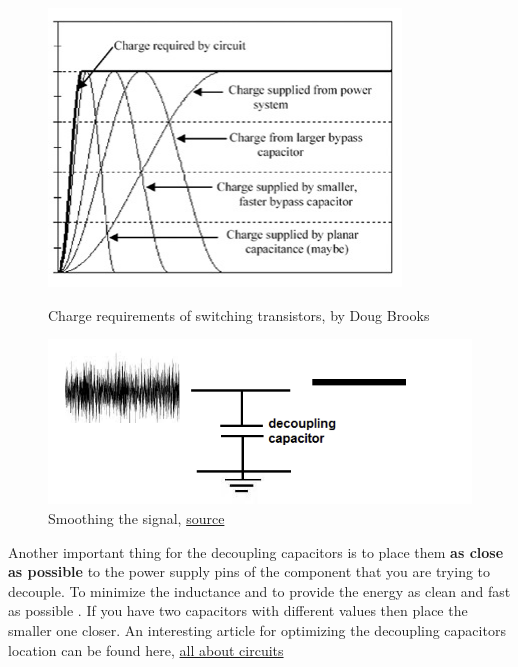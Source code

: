 \documentclass[12pt]{article}
\begin{document}
\begin{figure}[h!]
	\centering
	\begin{minipage}[b]{0.4\textwidth}
		\includegraphics[keepaspectratio, width = \textwidth, height=.3\textheight]{assets/bypass_charge.png}
		\caption{Charge requirements of switching transistors, by Doug Brooks}	
	\end{minipage}
	\hfill
	\begin{minipage}[b]{0.4\textwidth}
		\includegraphics[keepaspectratio, width = \textwidth]{assets/decoupling.png}
		\caption{Smoothing the signal, \href{http://www.learningaboutelectronics.com/Articles/Decoupling-capacitor.php}{source}}
	\end{minipage}
\end{figure}

Another important thing for the decoupling capacitors is to place them \textbf{as close as possible} to the power supply pins of the component that you are trying to decouple. To minimize the inductance and to provide the energy as clean and fast as possible 
. If you have two capacitors with different values then place the smaller one closer. An interesting article for optimizing the decoupling capacitors location can be found here, \href{https://www.allaboutcircuits.com/technical-articles/pcb-layout-tips-and-tricks-how-to-optimize-your-decoupling-connection/}{all about circuits}
\end{document}
